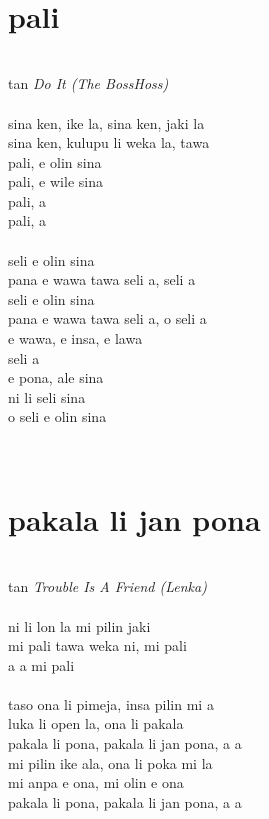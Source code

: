 \documentclass[a4paper]{amsbook}
\begin{document}
~\\

\section{pali}

\begin{center}
~\\
tan {\itshape Do It (The BossHoss)}\\
~\\
sina ken, ike la, sina ken, jaki la\\
sina ken, kulupu li weka la, tawa\\
pali, e olin sina\\
pali, e wile sina\\
pali, a\\
pali, a\\
~\\
seli e olin sina\\
pana e wawa tawa seli a, seli a\\
seli e olin sina\\
pana e wawa tawa seli a, o seli a\\
e wawa, e insa, e lawa\\
seli a\\
e pona, ale sina\\
ni li seli sina\\
o seli e olin sina\\
\end{center}

~\\

\section{pakala li jan pona}

\begin{center}
~\\
tan {\itshape Trouble Is A Friend (Lenka)}\\
~\\
ni li lon la mi pilin jaki\\
mi pali tawa weka ni, mi pali\\
a a mi pali\\
~\\
taso ona li pimeja, insa pilin mi a\\
luka li open la, ona li pakala\\
pakala li pona, pakala li jan pona, a a\\
mi pilin ike ala, ona li poka mi la\\
mi anpa e ona, mi olin e ona\\
pakala li pona, pakala li jan pona, a a\\
\end{center}
\end{document}
